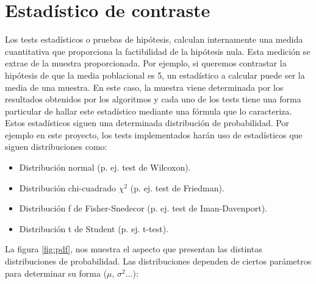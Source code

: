 \section{Estadístico de contraste} \label{estadistico}
Los tests estadísticos o pruebas de hipótesis, calculan internamente una medida cuantitativa que proporciona la
factibilidad de la hipótesis nula. Esta medición se extrae de la muestra proporcionada. Por ejemplo, si queremos
contrastar la hipótesis de que la media poblacional es 5, un estadístico a calcular puede ser la media de una
muestra. En este caso, la muestra viene determinada por los resultados obtenidos por los algoritmos y cada uno de
los tests tiene una forma particular de hallar este estadístico mediante una fórmula que lo caracteriza. Estos
estadísticos siguen una determinada distribución de probabilidad. Por ejemplo en este proyecto, los tests
implementados harán uso de estadísticos que siguen distribuciones como:
\begin{itemize}
\item Distribución normal (p. ej. test de Wilcoxon).
\item Distribución chi-cuadrado $\chi^2$ (p. ej. test de Friedman).
\item Distribución f de Fisher-Snedecor (p. ej. test de Iman-Davenport).
\item Distribución t de Student (p. ej. t-test).
\end{itemize}
La figura \ref{fig:pdf}, nos muestra el aspecto que presentan las distintas distribuciones de probabilidad. Las
distribuciones dependen de ciertos parámetros para determinar su forma ($\mu$, $\sigma^2$...): 
\begin{figure}[h]
\centering
{}
\end{figure}

